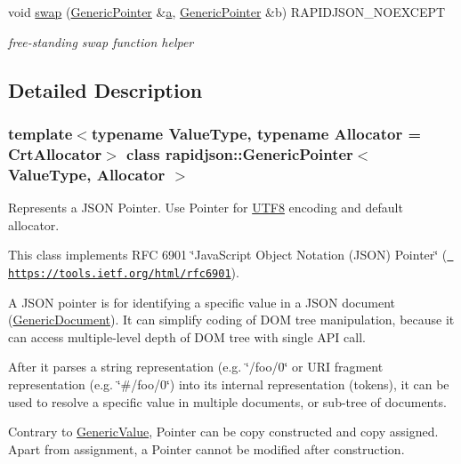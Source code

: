 \begin{DoxyCompactItemize}
void \mbox{\hyperlink{classrapidjson_1_1_generic_pointer_a249c61b5d4bed20c3f8972c57f46a937}{swap}} (\mbox{\hyperlink{classrapidjson_1_1_generic_pointer}{Generic\+Pointer}} \&\mbox{\hyperlink{namespacerapidjson_a11fce64e721729aaf6be4a485c78f231}{a}}, \mbox{\hyperlink{classrapidjson_1_1_generic_pointer}{Generic\+Pointer}} \&b) R\+A\+P\+I\+D\+J\+S\+O\+N\+\_\+\+N\+O\+E\+X\+C\+E\+PT
\begin{DoxyCompactList}\small\item\em free-\/standing swap function helper \end{DoxyCompactList}\end{DoxyCompactItemize}


\subsection{Detailed Description}
\subsubsection*{template$<$typename Value\+Type, typename Allocator = Crt\+Allocator$>$\newline
class rapidjson\+::\+Generic\+Pointer$<$ Value\+Type, Allocator $>$}

Represents a J\+S\+ON Pointer. Use Pointer for \mbox{\hyperlink{structrapidjson_1_1_u_t_f8}{U\+T\+F8}} encoding and default allocator. 

This class implements R\+FC 6901 \char`\"{}\+Java\+Script Object Notation (\+J\+S\+O\+N) Pointer\char`\"{} (\href{https://tools.ietf.org/html/rfc6901}{\texttt{ https\+://tools.\+ietf.\+org/html/rfc6901}}).

A J\+S\+ON pointer is for identifying a specific value in a J\+S\+ON document (\mbox{\hyperlink{classrapidjson_1_1_generic_document}{Generic\+Document}}). It can simplify coding of D\+OM tree manipulation, because it can access multiple-\/level depth of D\+OM tree with single A\+PI call.

After it parses a string representation (e.\+g. \char`\"{}/foo/0\char`\"{} or U\+RI fragment representation (e.\+g. \char`\"{}\#/foo/0\char`\"{}) into its internal representation (tokens), it can be used to resolve a specific value in multiple documents, or sub-\/tree of documents.

Contrary to \mbox{\hyperlink{classrapidjson_1_1_generic_value}{Generic\+Value}}, Pointer can be copy constructed and copy assigned. Apart from assignment, a Pointer cannot be modified after construction.

